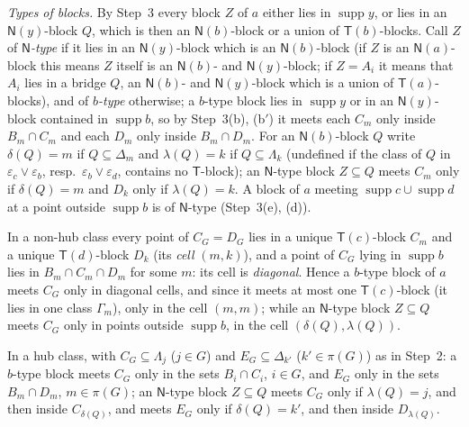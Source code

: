 \documentclass[11pt]{amsart}
\theoremstyle{definition}
\newcommand{\supp}{\operatorname{supp}}
\newcommand{\T}{\mathsf{T}}
\newcommand{\N}{\mathsf{N}}
\begin{document}
\emph{Types of blocks.} By Step~3 every block $Z$ of $a$ either lies in $\supp y$, or lies in an $\N(y)$-block $Q$, which is then an $\N(b)$-block or a union of $\T(b)$-blocks. Call $Z$ of \emph{$\N$-type} if it lies in an $\N(y)$-block which is an $\N(b)$-block (if $Z$ is an $\N(a)$-block this means $Z$ itself is an $\N(b)$- and $\N(y)$-block; if $Z=A_i$ it means that $A_i$ lies in a bridge $Q$, an $\N(b)$- and $\N(y)$-block which is a union of $\T(a)$-blocks), and of \emph{$b$-type} otherwise; a $b$-type block lies in $\supp y$ or in an $\N(y)$-block contained in $\supp b$, so by Step~3(b), (b$'$) it meets each $C_m$ only inside $B_m\cap C_m$ and each $D_m$ only inside $B_m\cap D_m$. For an $\N(b)$-block $Q$ write $\delta(Q)=m$ if $Q\subseteq\Delta_m$ and $\lambda(Q)=k$ if $Q\subseteq\Lambda_k$ (undefined if the class of $Q$ in $\varepsilon_c\vee\varepsilon_b$, resp.\ $\varepsilon_b\vee\varepsilon_d$, contains no $\T$-block); an $\N$-type block $Z\subseteq Q$ meets $C_m$ only if $\delta(Q)=m$ and $D_k$ only if $\lambda(Q)=k$. A block of $a$ meeting $\supp c\cup\supp d$ at a point outside $\supp b$ is of $\N$-type (Step~3(e), (d)).

In a non-hub class every point of $C_G=D_G$ lies in a unique $\T(c)$-block $C_m$ and a unique $\T(d)$-block $D_k$ (its \emph{cell} $(m,k)$), and a point of $C_G$ lying in $\supp b$ lies in $B_m\cap C_m\cap D_m$ for some $m$: its cell is \emph{diagonal}. Hence a $b$-type block of $a$ meets $C_G$ only in diagonal cells, and since it meets at most one $\T(c)$-block (it lies in one class $\Gamma_m$), only in the cell $(m,m)$; while an $\N$-type block $Z\subseteq Q$ meets $C_G$ only in points outside $\supp b$, in the cell $(\delta(Q),\lambda(Q))$.

In a hub class, with $C_G\subseteq\Lambda_j$ ($j\in G$) and $E_G\subseteq\Delta_{k'}$ ($k'\in\pi(G)$) as in Step~2: a $b$-type block meets $C_G$ only in the sets $B_i\cap C_i$, $i\in G$, and $E_G$ only in the sets $B_m\cap D_m$, $m\in\pi(G)$; an $\N$-type block $Z\subseteq Q$ meets $C_G$ only if $\lambda(Q)=j$, and then inside $C_{\delta(Q)}$, and meets $E_G$ only if $\delta(Q)=k'$, and then inside $D_{\lambda(Q)}$.
\end{document}
